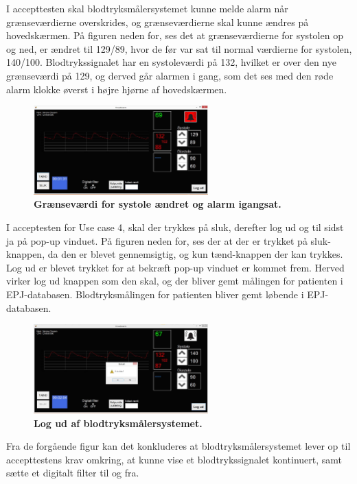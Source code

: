 I accepttesten skal blodtryksmålersystemet kunne melde alarm når grænseværdierne overskrides, og grænseværdierne skal kunne ændres på hovedskærmen. På figuren neden for, ses det at grænseværdierne for systolen op og ned, er ændret til 129/89, hvor de før var sat til normal værdierne for systolen, 140/100. Blodtrykssignalet har en systoleværdi på 132, hvilket er over den nye grænseværdi på 129, og derved går alarmen i gang, som det ses med den røde alarm klokke øverst i højre hjørne af hovedskærmen. 
\begin{figure}[H]
\includegraphics[width =0.6\textwidth , center]{billeder/IThovedGUIAlarm}
\caption{\textbf{Grænseværdi for systole ændret og alarm igangsat.}}
\end{figure}
I acceptesten for Use case 4, skal der trykkes på sluk, derefter log ud og til sidst ja på pop-up vinduet. På figuren neden for, ses der at der er trykket på sluk-knappen, da den er blevet gennemsigtig, og kun tænd-knappen der kan trykkes. Log ud er blevet trykket for at bekræft pop-up vinduet er kommet frem. Herved virker log ud knappen som den skal, og der bliver gemt målingen for patienten i EPJ-databasen. Blodtryksmålingen for patienten bliver gemt løbende i EPJ-databasen. 
\begin{figure}[H]
\includegraphics[width =0.6\textwidth , center]{billeder/IThovedGUILogUd}
\caption{\textbf{Log ud af blodtryksmålersystemet.}}
\end{figure}
Fra de forgående figur kan det konkluderes at blodtryksmålersystemet lever op til accepttestens krav omkring, at kunne vise et blodtrykssignalet kontinuert, samt sætte et digitalt filter til og fra. \\\\
